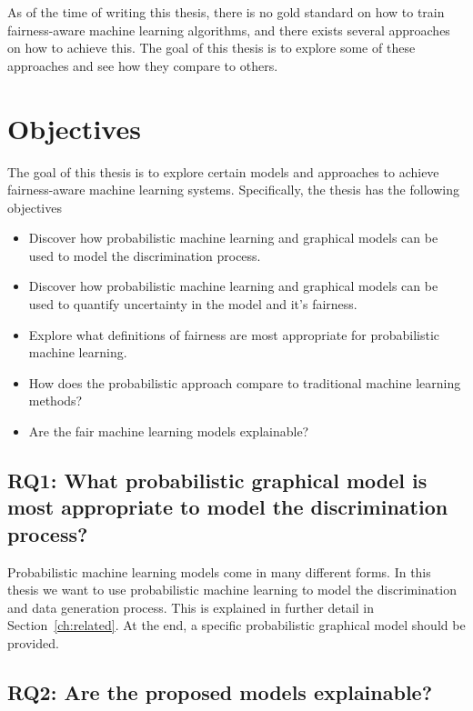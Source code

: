 As of the time of writing this thesis, there is no gold standard on how to train fairness-aware machine learning algorithms, and there exists several approaches on how to achieve this. \citep{Mehrabi:2021:CSUR} The goal of this thesis is to explore some of these approaches and see how they compare to others. 

\section{Objectives}
\label{sec:intro:objectives}

The goal of this thesis is to explore certain models and approaches to achieve fairness-aware machine learning systems. Specifically, the thesis has the following objectives

\begin{itemize}
    \item Discover how probabilistic machine learning and graphical models can be used to model the discrimination process.
    \item Discover how probabilistic machine learning and graphical models can be used to quantify uncertainty in the model and it's fairness.
    \item Explore what definitions of fairness are most appropriate for probabilistic machine learning.
    \item How does the probabilistic approach compare to traditional machine learning methods?
    \item Are the fair machine learning models explainable?
\end{itemize}

\subsection{RQ1: What probabilistic graphical model is most appropriate to model the discrimination process?}

Probabilistic machine learning models come in many different forms. In this thesis we want to use probabilistic machine learning to model the discrimination and data generation process. This is explained in further detail in Section~\ref{ch:related}. At the end, a specific probabilistic graphical model should be provided.

\subsection{RQ2: Are the proposed models explainable?}

